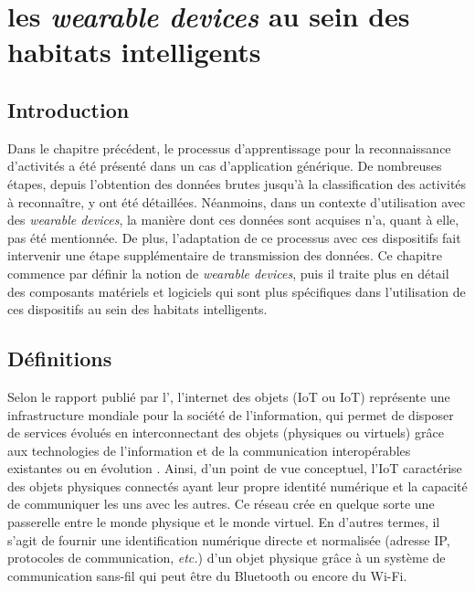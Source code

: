 \chapter{les \textit{wearable devices} au sein des habitats intelligents}
\label{chap:3}

\section{Introduction}

Dans le chapitre précédent, le processus d'apprentissage pour la reconnaissance d'activités a été présenté dans un cas d'application générique. De nombreuses étapes, depuis l'obtention des données brutes jusqu'à la classification des activités à reconnaître, y ont été détaillées. Néanmoins, dans un contexte d'utilisation avec des \textit{wearable devices}, la manière dont ces données sont acquises n'a, quant à elle, pas été mentionnée. De plus, l'adaptation de ce processus avec ces dispositifs fait intervenir une étape supplémentaire de transmission des données. Ce chapitre commence par définir la notion de \textit{wearable devices}, puis il traite plus en détail des composants matériels et logiciels qui sont plus spécifiques dans l'utilisation de ces dispositifs au sein des habitats intelligents.

\section{Définitions}

Selon le rapport publié par l'\cite{InternationalTelecommunicationUnion2012}, l'internet des objets (\acl{IoT} ou \acs{IoT}) représente une \og infrastructure mondiale pour la société de l'information, qui permet de disposer de services évolués en interconnectant des objets (physiques ou virtuels) grâce aux technologies de l'information et de la communication interopérables existantes ou en évolution \fg. Ainsi, d'un point de vue conceptuel, l'\acs{IoT} caractérise des objets physiques connectés ayant leur propre identité numérique et la capacité de communiquer les uns avec les autres. Ce réseau crée en quelque sorte une passerelle entre le monde physique et le monde virtuel. En d'autres termes, il s'agit de fournir une identification numérique directe et normalisée (adresse IP, protocoles de communication, \textit{etc.}) d'un objet physique grâce à un système de communication sans-fil qui peut être du Bluetooth ou encore du Wi-Fi.

